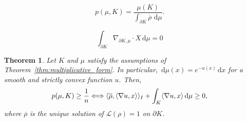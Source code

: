 \documentclass[10pt,a4paper]{amsart}
\newtheorem{theorem}{Theorem}
\newcommand{\di}{\, \mathrm{d}}
\newcommand{\rhobar}{\overline{\rho}}
\begin{document}
\begin{equation}\label{eq:new_concavity expression}
p(\mu,K) = \frac{\mu(K)}{\int_{\partial K} \overline{\rho}\,\di\mu}.
\end{equation}

\begin{equation}\label{eq:weighted_div}
    \int_{\partial K} \nabla_{\partial K, \mu} \cdot X \di \mu = 0
\end{equation}

\begin{theorem}\label{thm:reformulation}
    Let $K$ and $\mu$ satisfy the assumptions of Theorem~\ref{thm:multiplicative_form}. In particular, $\di \mu(x)=e^{-u(x)}\di x$ for a smooth and strictly convex function $u$. Then, 
    \begin{equation}\label{eq:equivalent_dim_BM}
        p(\mu,K) \geq \frac{1}{n} \Longleftrightarrow \langle \rhobar,\langle \nabla u, x \rangle \rangle_{\rm I}+\int_K \langle \nabla u, x \rangle \di \mu \geq 0,
    \end{equation}
    where $\rhobar$ is the unique solution of $\mathcal{L}(\rho)=1$ on $\partial K$.
\end{theorem}
\end{document}
